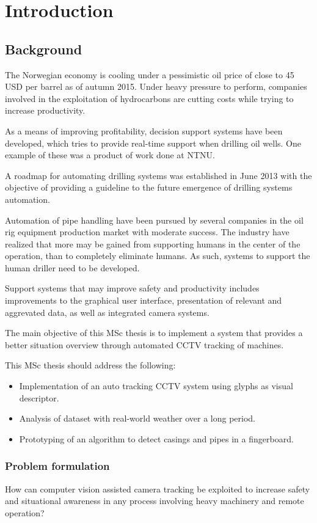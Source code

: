 \chapter{Introduction}
\setcounter{page}{1}
\section{Background}
The Norwegian economy is cooling under a pessimistic oil price of close to 45 USD per barrel as of autumn 2015. Under heavy pressure to perform, companies involved in the exploitation of hydrocarbons are cutting costs while trying to increase productivity.

As a means of improving profitability, decision support systems have been developed, which tries to provide real-time support when drilling oil wells. One example of these was a product of work done at NTNU.

A roadmap for automating drilling systems was established in June 2013 with the objective of providing a guideline to the future emergence of drilling systems automation.

Automation of pipe handling have been pursued by several companies in the oil rig equipment production market with moderate success. The industry have realized that more may be gained from supporting humans in the center of the operation, than to completely eliminate humans. As such, systems to support the human driller need to be developed.

Support systems that may improve safety and productivity includes improvements to the graphical user interface, presentation of relevant and aggrevated data, as well as integrated camera systems.

The main objective of this MSc thesis is to implement a system that provides a better situation overview through automated CCTV tracking of machines.

This MSc thesis should address the following:
\begin{itemize}
\item Implementation of an auto tracking CCTV system using glyphs as visual descriptor.
\item Analysis of dataset with real-world weather over a long period.
\item Prototyping of an algorithm to detect casings and pipes in a fingerboard.
\end{itemize}

\subsection{Problem formulation}
How can computer vision assisted camera tracking be exploited to increase safety and situational awareness in any process involving heavy machinery and remote operation?

